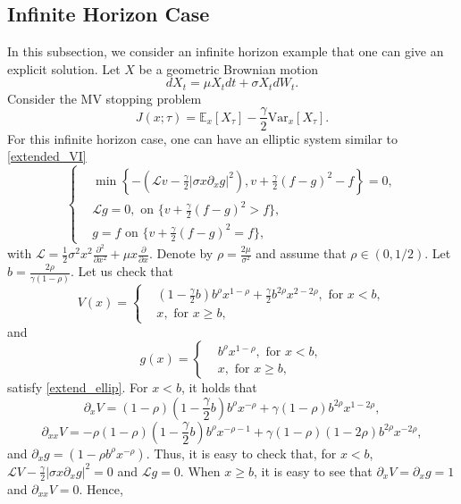 \documentclass[11pt]{article}
\begin{document}
\subsection{Infinite Horizon Case}\label{subsec:1}
In this subsection, we consider an infinite horizon example that one can give an explicit solution.  Let $X$ be a geometric Brownian motion
$$
dX_t=\mu X_tdt+\sigma X_t dW_t.
$$
Consider the  MV stopping problem 
$$
J(x;\tau)=\mathbb E_x\left[X_\tau\right]-\frac{\gamma}{2}\text{Var}_x\left[X_\tau\right]. 
$$
For this infinite horizon case, one can have an elliptic system similar to \eqref{extended_VI}
\begin{equation}\label{extend_ellip}
\left\{
\begin{split}
&\min\left \{-\left(\mathcal L v-\frac{\gamma}{2}\left|\sigma x\partial_x g\right|^2\right),v+\frac{\gamma}{2}(f-g)^2-f\right\}=0,\\
& \mathcal Lg=0, \text{ on $\{v+\frac{\gamma}{2}(f-g)^2 >f\}$},\\
&g=f \text{ on $\{v+\frac{\gamma}{2}(f-g)^2 =f\}$},
\end{split}
\right.
\end{equation}
with $\mathcal L=\frac{1}{2} \sigma^2x^2 \frac{\partial^2}{\partial x^2}+\mu x\frac{\partial }{\partial x}$. Denote by $\rho=\frac{2\mu}{\sigma^2}$ and assume that $\rho \in (0,1/2)$. Let $b=\frac{2\rho}{\gamma (1-\rho)}$. Let us check that
\begin{equation*}
V(x)=\left\{
\begin{split}
&(1-\frac{\gamma}{2}b)b^{\rho}x^{1-\rho}+\frac{\gamma}{2} b^{2\rho}x^{2-2\rho},\text{ for $x<b$},\\
&x,\text{ for $x\ge b$},
\end{split}
\right.
\end{equation*}
and
\begin{equation*}
g(x)=\left\{
\begin{split}
&b^{\rho}x^{1-\rho},\text{ for $x<b$},\\
&x,\text{ for $x\ge b$},
\end{split}
\right.
\end{equation*}
satisfy \eqref{extend_ellip}.  For $x<b$, it holds that 
$$
\partial_x V=(1-\rho)(1-\frac\gamma 2 b)b^\rho x^{-\rho}+\gamma(1-\rho )b^{2\rho}x^{1-2\rho},
$$
$$
\partial_{xx} V=-\rho (1-\rho)(1-\frac\gamma 2 b)b^\rho x^{-\rho-1}+\gamma(1-\rho )(1-2\rho)b^{2\rho}x^{-2\rho},
$$
and $\partial_x g=(1-\rho b^\rho x^{-\rho})$. Thus, it is easy to check that, for $x<b$, $\mathcal L V-\frac{\gamma}{2}\left|\sigma x \partial_x g\right|^2=0$ and $\mathcal L g=0$.  When $x \ge b$, it is easy to see that $\partial_x V=\partial_x g=1$ and $\partial_{xx}V=0$. Hence,
\end{document}
